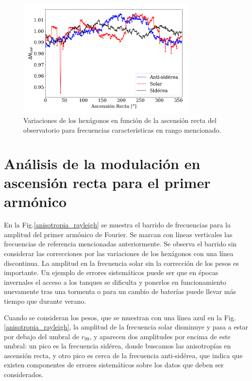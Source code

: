 			\begin{figure}[H]
				\centering
				\includegraphics[width=0.8\textwidth]{weights_2013_2020.png}
				\caption{Variaciones de los hexágonos en función de la ascensión recta del observatorio para frecuencias características en rango mencionado. }
				\label{pesos_bin_1_2}
			\end{figure}


\section{Análisis de la modulación en ascensión recta para el primer armónico}

En la Fig.\ref{anisotropia_rayleigh} se muestra el barrido de frecuencias para la amplitud del primer armónico de Fourier. Se marcan con líneas verticales las frecuencias de referencia mencionadas anteriormente. Se observa el barrido sin considerar las correcciones por las variaciones de los hexágonos con una línea discontinua. La  amplitud  en la frecuencia solar sin la corrección de los pesos es importante. Un ejemplo de errores sistemáticos puede ser que en épocas invernales el acceso a los tanques se dificulta y ponerlos en funcionamiento nuevamente tras una tormenta o para un cambio de baterías puede llevar más tiempo que durante verano. 



Cuando se consideran los pesos, que se muestran con una línea azul en la Fig. \ref{anisotropia_rayleigh}, la amplitud de la frecuencia solar disminuye y pasa a estar por debajo del umbral de $r_{99}$, y aparecen dos amplitudes por encima de este umbral: un pico es la frecuencia sidérea, donde buscamos las anisotropías en ascensión recta, y otro pico es cerca de la frecuencia anti-sidérea, que indica que existen componentes de errores sistemáticos sobre los datos que deben ser considerados. 



